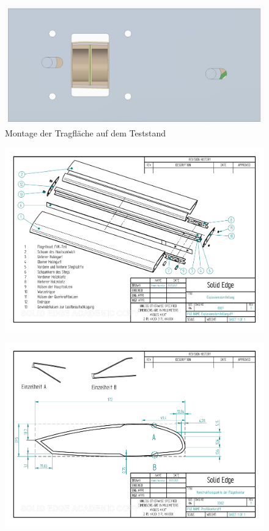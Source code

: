 \begin{figure}[h]
	\includegraphics[width=1.0\textwidth]{Bilder/MontagePlatte.jpg}
	\caption{Montage der Tragfläche auf dem Teststand}
	\label{fig:MontagePlatte}
\end{figure}
\begin{figure}[h]
	\includegraphics[angle=90, scale=0.85]{PDFs/Explosionsdarstellung.pdf}
	\centering
\end{figure}
\begin{figure}[h]
	\includegraphics[angle=90, scale=0.85]{PDFs/Profilkontur.pdf}
	\centering
\end{figure}
